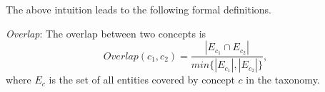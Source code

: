 %
%
The above intuition leads to the following formal definitions.
\begin{definition}
\emph{Overlap}:
The overlap between two concepts is
\begin{equation}
\label{eq:overlap}
Overlap(c_1,c_2)=\frac{|E_{c_1}\cap E_{c_2}|}{min\{ |E_{c_1}|,|E_{c_2}| \}},
\end{equation}
where $E_c$ is the set of all entities covered by concept $c$ in the
taxonomy.
\end{definition}

